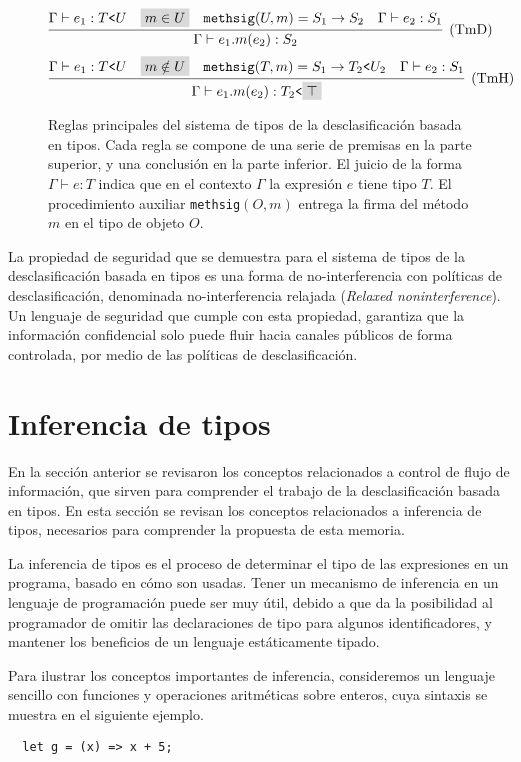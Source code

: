 \begin{figure}[ht]
  \centering
  \[
    \infer[(\text{TmD})]
    {\Gamma \vdash e_1.m(e_2) : S_2}
    {
    \Gamma \vdash e_1 : T\text{\texttt{<}}U&
    \highlight{m\in U}&
    \mathtt{methsig}(U,m) = S_1 \rightarrow S_2&
    \Gamma \vdash e_2 : S_1
    }
  \]
  \[
    \infer[(\text{TmH})]
    {\Gamma \vdash e_1.m(e_2) : T_2\text{\texttt{<}}\highlight{\top}}
    {
    \Gamma \vdash e_1 : T\text{\texttt{<}}U&
    \highlight{m\notin U}&
    \mathtt{methsig}(T,m) = S_1 \rightarrow T_2\text{\texttt{<}}U_2&
    \Gamma \vdash e_2 : S_1
    }
  \]
  \caption{Reglas principales del sistema de tipos de la desclasificación basada en tipos. Cada regla se compone de una serie de premisas en la parte superior, y una conclusión en la parte inferior. El juicio de la forma $\Gamma \vdash e : T$ indica que en el contexto $\Gamma$ la expresión $e$ tiene tipo $T$. El procedimiento auxiliar \texttt{methsig}$(O,m)$ entrega la firma del método $m$ en el tipo de objeto $O$.}
  \label{reglas}
\end{figure}

La propiedad de seguridad que se demuestra para el sistema de tipos de la desclasificación basada en tipos es una forma de no-interferencia con políticas de desclasificación, denominada no-interferencia relajada (\emph{Relaxed noninterference}). Un lenguaje de seguridad que cumple con esta propiedad, garantiza que la información confidencial solo puede fluir hacia canales públicos de forma controlada, por medio de las políticas de desclasificación.

\section{Inferencia de tipos} \label{inference}
En la sección anterior se revisaron los conceptos relacionados a control de flujo de información, que sirven para comprender el trabajo de la desclasificación basada en tipos. En esta sección se revisan los conceptos relacionados a inferencia de tipos, necesarios para comprender la propuesta de esta memoria.

La inferencia de tipos es el proceso de determinar el tipo de las expresiones en un programa, basado en cómo son usadas. Tener un mecanismo de inferencia en un lenguaje de programación puede ser muy útil, debido a que da la posibilidad al programador de omitir las declaraciones de tipo para algunos identificadores, y mantener los beneficios de un lenguaje estáticamente tipado.

Para ilustrar los conceptos importantes de inferencia, consideremos un lenguaje sencillo con funciones y operaciones aritméticas sobre enteros, cuya sintaxis se muestra en el siguiente ejemplo.
\vspace{0.8em}
\begin{ej}
  \normalfont
  \label{ej2-8}
\begin{lstlisting}
  let g = (x) => x + 5;
\end{lstlisting}
\end{ej}

